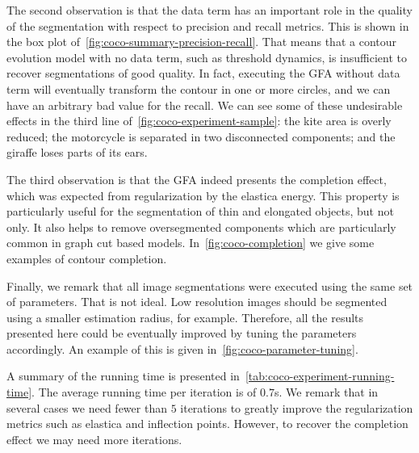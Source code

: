 \documentclass[review]{siamart220329}
\begin{document}
The second observation is that the data term has an important role in the
quality of the segmentation with respect to precision and recall metrics. This
is shown in the box plot of~\cref{fig:coco-summary-precision-recall}. That means
that a contour evolution model with no data term, such as threshold dynamics, is
insufficient to recover segmentations of good quality. In fact, executing the
GFA without data term will eventually transform the contour in one or more
circles, and we can have an arbitrary bad value for the recall. We can see some
of these undesirable effects in the third line
of~\cref{fig:coco-experiment-sample}: the kite area is overly reduced; the
motorcycle is separated in two disconnected components; and the giraffe loses
parts of its ears.

The third observation is that the GFA indeed presents the completion effect,
which was expected from regularization by the elastica energy. This property is
particularly useful for the segmentation of thin and elongated objects, but not
only. It also helps to remove oversegmented components which are particularly
common in graph cut based models. In~\cref{fig:coco-completion} we give some
examples of contour completion.

Finally, we remark that all image segmentations were executed using the same set
of parameters. That is not ideal. Low resolution images should be segmented
using a smaller estimation radius, for example. Therefore, all the results
presented here could be eventually improved by tuning the parameters
accordingly. An example of this is given in~\cref{fig:coco-parameter-tuning}.

A summary of the running time is presented
in~\cref{tab:coco-experiment-running-time}. The average running time per
iteration is of $0.7$s. We remark that in several cases we need fewer than $5$
iterations to greatly improve the regularization metrics such as elastica and
inflection points. However, to recover the completion effect we may need more
iterations.
%
%

\end{document}

